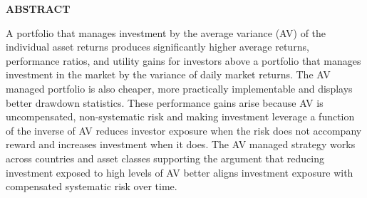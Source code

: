 \centerline{\bf ABSTRACT}

\begin{doublespace}  %
%
%
%
%
%
%
%
%
  
\noindent A portfolio that manages investment by the average variance (AV) of the individual asset returns produces significantly higher average returns, performance ratios, and utility gains for investors above a portfolio that manages investment in the market by the variance of daily market returns. The AV managed portfolio is also cheaper, more practically implementable and displays better drawdown statistics. These performance gains arise because AV is uncompensated, non-systematic risk and making investment leverage a function of the inverse of AV reduces investor exposure when the risk does not accompany reward and increases investment when it does. The AV managed strategy works across countries and asset classes supporting the argument that reducing investment exposed to high levels of AV better aligns investment exposure with compensated systematic risk over time.
\end{doublespace}